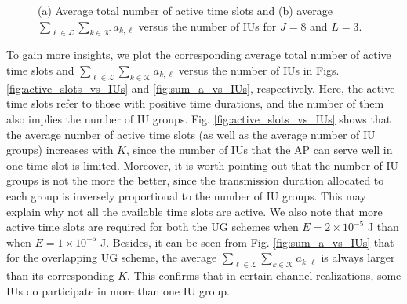 \documentclass[12pt,draftclsnofoot, onecolumn]{IEEEtran}
\theoremstyle{plain}
\begin{document}
\begin{sloppypar}
\begin{figure}[!t]
	\hspace{-4.5mm}
	\hspace{-8.5mm}
	\vspace{-1.4mm}
	\caption{(a) Average total number of active time slots and (b) average $\sum_{\ell\in\mathcal L}\sum_{k\in\mathcal K}a_{k,\ell}$ versus the number of IUs for $J = 8$ and $L = 3$.}
	\label{fig:resource_vs_IUs}
	\vspace{-2mm}
\end{figure} 

To gain more insights, we plot the corresponding average total number of active time slots and $\sum_{\ell\in\mathcal L}\sum_{k \in\mathcal K}a_{k,\ell}$ versus the number of IUs in Figs. \ref{fig:active_slots_vs_IUs} and \ref{fig:sum_a_vs_IUs}, respectively. Here, the active time slots refer to those with positive time durations, and the number of them also implies the number of IU groups. Fig. \ref{fig:active_slots_vs_IUs} shows that the average number of active time slots (as well as the average number of IU groups) increases with $K$, since the number of IUs that the AP can serve well in one time slot is limited. Moreover, it is worth pointing out that the number of IU groups is not the more the better, since the transmission duration allocated to each group is inversely proportional to the number of IU groups. This may explain why not all the available time slots are active. We also note that more active time slots are required for both the UG schemes when $E = 2 \times 10^{-5}$ J than when $E = 1 \times 10^{-5}$ J. Besides, it can be seen from Fig. \ref{fig:sum_a_vs_IUs} that for the overlapping UG scheme, the average $\sum_{\ell\in\mathcal L}\sum_{k \in\mathcal K}a_{k,\ell}$ is always larger than its corresponding $K$. This confirms that in certain channel realizations, some IUs do participate in more than one IU group. 


\end{sloppypar}
\end{document}
